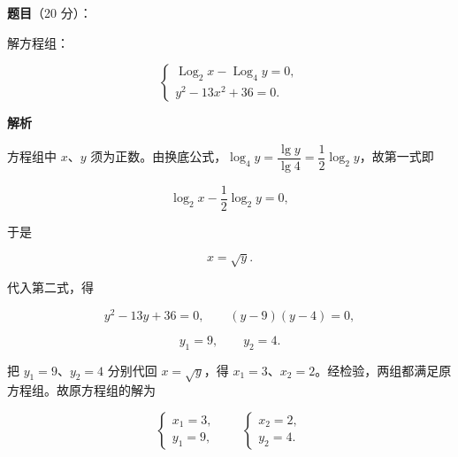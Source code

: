 \begin{answer}

\textbf{题目}（20 分）：

解方程组：

\nopagebreak[4]
\[
\begin{cases}
\operatorname{Log}_2 x-\operatorname{Log}_4 y=0,\\
y^2-13x^2+36=0.
\end{cases}
\]

\textbf{解析}

方程组中 $x$、$y$ 须为正数。由换底公式，$\log_4y=\dfrac{\lg y}{\lg 4}=\dfrac12\log_2y$，故第一式即

\nopagebreak[4]
\[
\log_2x-\frac12\log_2y=0,
\]

于是

\nopagebreak[4]
\[
x=\sqrt{y}.
\]

代入第二式，得

\nopagebreak[4]
\[
y^2-13y+36=0,
\qquad
(y-9)(y-4)=0,
\]

\nopagebreak[4]
\[
y_1=9,
\qquad
y_2=4.
\]

把 $y_1=9$、$y_2=4$ 分别代回 $x=\sqrt y$，得 $x_1=3$、$x_2=2$。经检验，两组都满足原方程组。故原方程组的解为

\nopagebreak[4]
\[
\begin{cases}
x_1=3,\\
y_1=9,
\end{cases}
\qquad
\begin{cases}
x_2=2,\\
y_2=4.
\end{cases}
\]


\end{answer}

